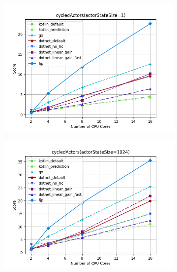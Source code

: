\documentclass{article}
\begin{document}
\begin{figure}[H]
    \centering
    \begin{subfigure}[b]{0.48\textwidth}
        \includegraphics[width=\linewidth]{plots/cycledActors(actorStateSize=1)_with_legend.png}
    \end{subfigure}
    \begin{subfigure}[b]{0.48\textwidth}
        \includegraphics[width=\linewidth]{plots/cycledActors(actorStateSize=1024)_with_legend.png}
    \end{subfigure}

    \vspace{1em}


\end{figure}
\end{document}
